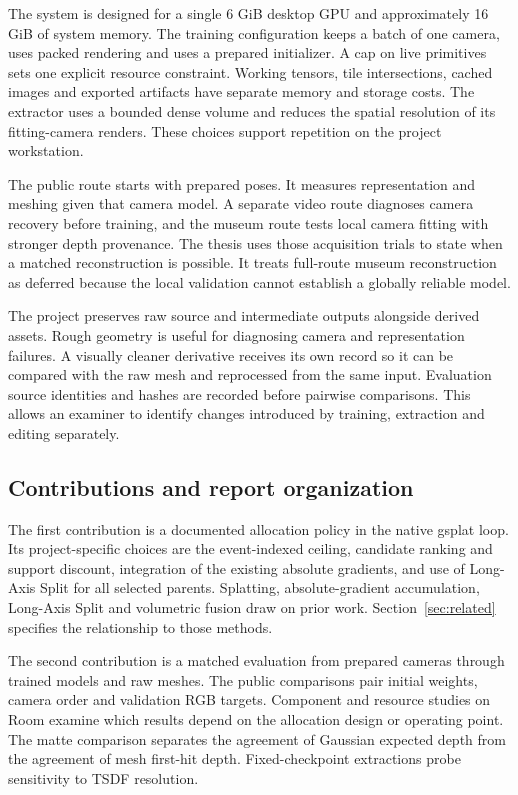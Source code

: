 The system is designed for a single 6 GiB desktop GPU and approximately 16 GiB of system memory. The training configuration keeps a batch of one camera, uses packed rendering and uses a prepared initializer. A cap on live primitives sets one explicit resource constraint. Working tensors, tile intersections, cached images and exported artifacts have separate memory and storage costs. The extractor uses a bounded dense volume and reduces the spatial resolution of its fitting-camera renders. These choices support repetition on the project workstation.

The public route starts with prepared poses. It measures representation and meshing given that camera model. A separate video route diagnoses camera recovery before training, and the museum route tests local camera fitting with stronger depth provenance. The thesis uses those acquisition trials to state when a matched reconstruction is possible. It treats full-route museum reconstruction as deferred because the local validation cannot establish a globally reliable model.

The project preserves raw source and intermediate outputs alongside derived assets. Rough geometry is useful for diagnosing camera and representation failures. A visually cleaner derivative receives its own record so it can be compared with the raw mesh and reprocessed from the same input. Evaluation source identities and hashes are recorded before pairwise comparisons. This allows an examiner to identify changes introduced by training, extraction and editing separately.

\subsection{Contributions and report organization}
The first contribution is a documented allocation policy in the native gsplat loop. Its project-specific choices are the event-indexed ceiling, candidate ranking and support discount, integration of the existing absolute gradients, and use of Long-Axis Split for all selected parents. Splatting, absolute-gradient accumulation, Long-Axis Split and volumetric fusion draw on prior work. Section~\ref{sec:related} specifies the relationship to those methods.

The second contribution is a matched evaluation from prepared cameras through trained models and raw meshes. The public comparisons pair initial weights, camera order and validation RGB targets. Component and resource studies on Room examine which results depend on the allocation design or operating point. The matte comparison separates the agreement of Gaussian expected depth from the agreement of mesh first-hit depth. Fixed-checkpoint extractions probe sensitivity to TSDF resolution.

